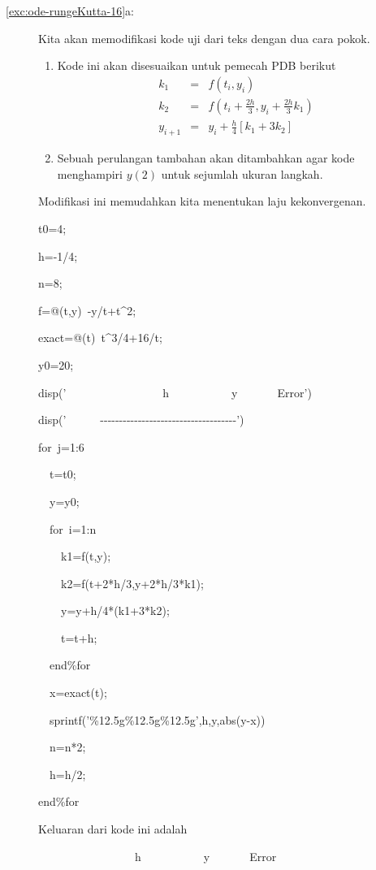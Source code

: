 \begin{description}
\item [{\ref{exc:ode-rungeKutta-16}a:}] Kita akan memodifikasi kode uji
dari teks dengan dua cara pokok.

\begin{enumerate}
\item Kode ini akan disesuaikan untuk pemecah PDB berikut
\begin{eqnarray*}
k_{1} & = & f(t_{i},y_{i})\\
k_{2} & = & f\left(t_{i}+\frac{2h}{3},y_{i}+\frac{2h}{3}k_{1}\right)\\
y_{i+1} & = & y_{i}+\frac{h}{4}\left[k_{1}+3k_{2}\right]
\end{eqnarray*}
\item Sebuah perulangan tambahan akan ditambahkan agar kode menghampiri
$y(2)$ untuk sejumlah ukuran langkah.
\end{enumerate}
Modifikasi ini memudahkan kita menentukan laju kekonvergenan.
\begin{lyxcode}
t0=4;

h=-1/4;

n=8;

f=@(t,y)~-y/t+t\textasciicircum 2;

exact=@(t)~t\textasciicircum 3/4+16/t;

y0=20;

disp('~~~~~~~~~~~~~~~~~h~~~~~~~~~~~y~~~~~~~Error')

disp('~~~~~~-{}-{}-{}-{}-{}-{}-{}-{}-{}-{}-{}-{}-{}-{}-{}-{}-{}-{}-{}-{}-{}-{}-{}-{}-{}-{}-{}-{}-{}-{}-{}-{}-{}-{}-{}-')

for~j=1:6

~~t=t0;

~~y=y0;

~~for~i=1:n

~~~~k1=f(t,y);

~~~~k2=f(t+2{*}h/3,y+2{*}h/3{*}k1);

~~~~y=y+h/4{*}(k1+3{*}k2);

~~~~t=t+h;

~~end\%for

~~x=exact(t);

~~sprintf('\%12.5g\%12.5g\%12.5g',h,y,abs(y-x))

~~n=n{*}2;

~~h=h/2;

end\%for
\end{lyxcode}
Keluaran dari kode ini adalah
\begin{lyxcode}
~~~~~~~~~~~~~~~~~h~~~~~~~~~~~y~~~~~~~Error


\end{lyxcode}
\end{description}
